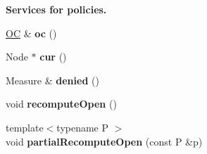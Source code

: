 \begin{Indent}{\bf Services for policies.}\par
\begin{DoxyCompactItemize}
\item 
\hyperlink{structslb_1_1ext_1_1algorithm_1_1Astar_a7c221266394f6833a6f5aadb0f76315d}{OC} \& {\bfseries oc} ()\hypertarget{structslb_1_1ext_1_1algorithm_1_1Astar_a60959a673f2908ca3cd8dd864b486e64}{}\label{structslb_1_1ext_1_1algorithm_1_1Astar_a60959a673f2908ca3cd8dd864b486e64}

\item 
Node $\ast$ {\bfseries cur} ()\hypertarget{structslb_1_1ext_1_1algorithm_1_1Astar_ac650497d106eb9328f2cbdf0b25bb35f}{}\label{structslb_1_1ext_1_1algorithm_1_1Astar_ac650497d106eb9328f2cbdf0b25bb35f}

\item 
Measure \& {\bfseries denied} ()\hypertarget{structslb_1_1ext_1_1algorithm_1_1Astar_a9eb913b6ba31da6179009bcf23a4c551}{}\label{structslb_1_1ext_1_1algorithm_1_1Astar_a9eb913b6ba31da6179009bcf23a4c551}

\item 
void {\bfseries recompute\+Open} ()\hypertarget{structslb_1_1ext_1_1algorithm_1_1Astar_a52da702a953cda53a341c1a9ab0d701a}{}\label{structslb_1_1ext_1_1algorithm_1_1Astar_a52da702a953cda53a341c1a9ab0d701a}

\item 
{\footnotesize template$<$typename P $>$ }\\void {\bfseries partial\+Recompute\+Open} (const P \&p)\hypertarget{structslb_1_1ext_1_1algorithm_1_1Astar_a89bd403817a1192686aeb5fd85047a3a}{}\label{structslb_1_1ext_1_1algorithm_1_1Astar_a89bd403817a1192686aeb5fd85047a3a}

\end{DoxyCompactItemize}
\end{Indent}
